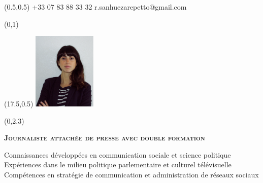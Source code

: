 \documentclass[30pt, french]{tccv}
\begin{document}
\begin{upshape}
\fontsize{9pt}{1em}\color{text}\selectfont



%
%




\begin{textblock}{6.5}(0.5,0.5)
    {+33 07 83 88 33 32}
    {r.sanhuezarepetto@gmail.com}
\end{textblock}

\begin{textblock}{21}(0,1)
\end{textblock}

\begin{textblock}{21}(17.5,0.5)
		\includegraphics[width=3cm]{../Figure/Rocio3.png}
\end{textblock}  



\begin{textblock}{21}(0,2.3)

\begin{center}
\fontsize{10pt}{1.5em}\color{text}\bodyfontlight\upshape\selectfont

	{\fontsize{14pt}{5em}\scshape\bfseries Journaliste attachée de presse avec double formation \\} 

	\vspace{5pt}
Connaissances développées en communication sociale et science politique 			\\
Expériences dans le milieu politique parlementaire et culturel télévisuelle 		 	\\
Compétences en stratégie de communication et administration de réseaux sociaux 			\\


\end{center}
\end{textblock}
\end{upshape}
\end{document}
